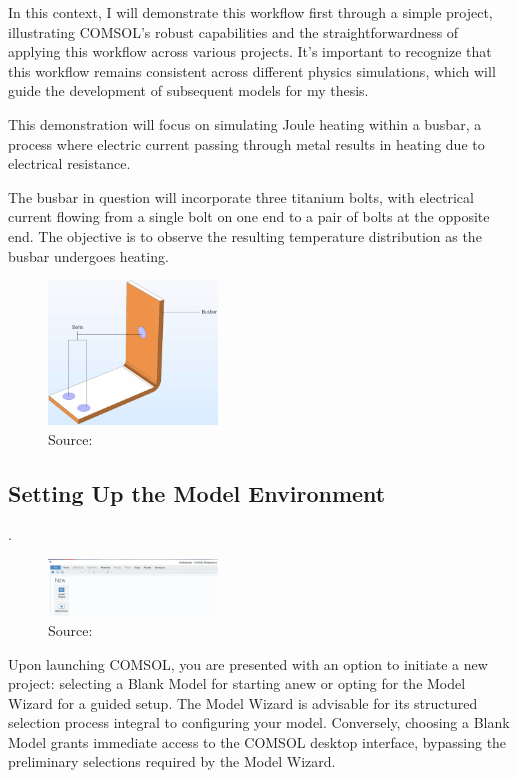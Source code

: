 In this context, I will demonstrate this workflow first through a simple project, illustrating COMSOL's robust capabilities and the straightforwardness of applying this workflow across various projects. It's important to recognize that this workflow remains consistent across different physics simulations, which will guide the development of subsequent models for my thesis.

This demonstration will focus on simulating Joule heating within a busbar, a process where electric current passing through metal results in heating due to electrical resistance.

The busbar in question will incorporate three titanium bolts, with electrical current flowing from a single bolt on one end to a pair of bolts at the opposite end. The objective is to observe the resulting temperature distribution as the busbar undergoes heating.

\begin{figure}[ht!]
  \centering
  \includegraphics[width=0.4\textwidth]{Chapters/Figures/Chapter 3 Figures/Busbar.png}
  \caption{ Source: \cite{}}
  \label{}
\end{figure}

\subsection{Setting Up the Model Environment}.
\begin{figure}[ht!]
  \centering
  \includegraphics[width=0.4\textwidth]{Chapters/Figures/Chapter 3 Figures/Set-up Screen.png}
  \caption{ Source: \cite{}}
  \label{}
\end{figure}

Upon launching COMSOL, you are presented with an option to initiate a new project: selecting a Blank Model for starting anew or opting for the Model Wizard for a guided setup. The Model Wizard is advisable for its structured selection process integral to configuring your model. Conversely, choosing a Blank Model grants immediate access to the COMSOL desktop interface, bypassing the preliminary selections required by the Model Wizard.


